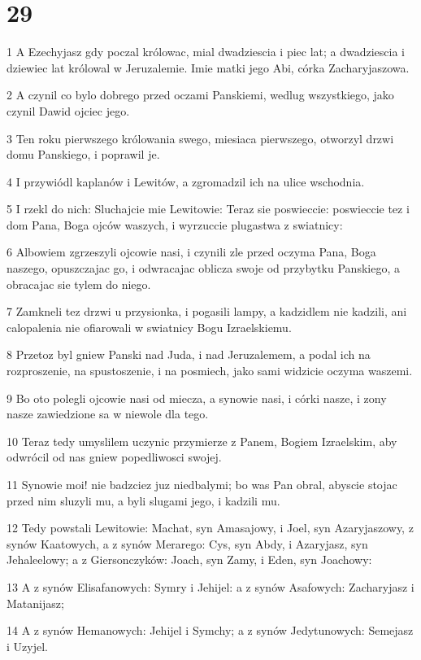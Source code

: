\chapter{29}

\par 1 A Ezechyjasz gdy poczal królowac, mial dwadziescia i piec lat; a dwadziescia i dziewiec lat królowal w Jeruzalemie. Imie matki jego Abi, córka Zacharyjaszowa.
\par 2 A czynil co bylo dobrego przed oczami Panskiemi, wedlug wszystkiego, jako czynil Dawid ojciec jego.
\par 3 Ten roku pierwszego królowania swego, miesiaca pierwszego, otworzyl drzwi domu Panskiego, i poprawil je.
\par 4 I przywiódl kaplanów i Lewitów, a zgromadzil ich na ulice wschodnia.
\par 5 I rzekl do nich: Sluchajcie mie Lewitowie: Teraz sie poswieccie: poswieccie tez i dom Pana, Boga ojców waszych, i wyrzuccie plugastwa z swiatnicy:
\par 6 Albowiem zgrzeszyli ojcowie nasi, i czynili zle przed oczyma Pana, Boga naszego, opuszczajac go, i odwracajac oblicza swoje od przybytku Panskiego, a obracajac sie tylem do niego.
\par 7 Zamkneli tez drzwi u przysionka, i pogasili lampy, a kadzidlem nie kadzili, ani calopalenia nie ofiarowali w swiatnicy Bogu Izraelskiemu.
\par 8 Przetoz byl gniew Panski nad Juda, i nad Jeruzalemem, a podal ich na rozproszenie, na spustoszenie, i na posmiech, jako sami widzicie oczyma waszemi.
\par 9 Bo oto polegli ojcowie nasi od miecza, a synowie nasi, i córki nasze, i zony nasze zawiedzione sa w niewole dla tego.
\par 10 Teraz tedy umyslilem uczynic przymierze z Panem, Bogiem Izraelskim, aby odwrócil od nas gniew popedliwosci swojej.
\par 11 Synowie moi! nie badzciez juz niedbalymi; bo was Pan obral, abyscie stojac przed nim sluzyli mu, a byli slugami jego, i kadzili mu.
\par 12 Tedy powstali Lewitowie: Machat, syn Amasajowy, i Joel, syn Azaryjaszowy, z synów Kaatowych, a z synów Merarego: Cys, syn Abdy, i Azaryjasz, syn Jehaleelowy; a z Giersonczyków: Joach, syn Zamy, i Eden, syn Joachowy:
\par 13 A z synów Elisafanowych: Symry i Jehijel: a z synów Asafowych: Zacharyjasz i Matanijasz;
\par 14 A z synów Hemanowych: Jehijel i Symchy; a z synów Jedytunowych: Semejasz i Uzyjel.
